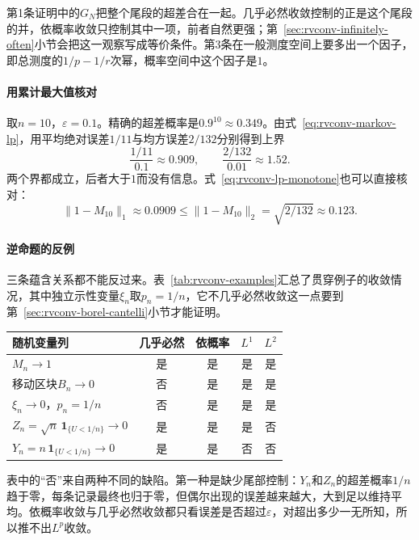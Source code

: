 第1条证明中的$G_N$把整个尾段的超差合在一起。几乎必然收敛控制的正是这个尾段的并，依概率收敛只控制其中一项，前者自然更强；第~\ref{sec:rvconv-infinitely-often}小节会把这一观察写成等价条件。第3条在一般测度空间上要多出一个因子，即总测度的$1/p-1/r$次幂，概率空间中这个因子是$1$。

\paragraph{用累计最大值核对}
取$n=10$，$\varepsilon=0.1$。精确的超差概率是$0.9^{10}\approx0.349$。由式~\eqref{eq:rvconv-markov-lp}，用平均绝对误差$1/11$与均方误差$2/132$分别得到上界
\[
 \frac{1/11}{0.1}\approx0.909,\qquad \frac{2/132}{0.01}\approx1.52 .
\]
两个界都成立，后者大于$1$而没有信息。式~\eqref{eq:rvconv-lp-monotone}也可以直接核对：
\[
 \lVert1-M_{10}\rVert_{1}\approx0.0909\leq\lVert1-M_{10}\rVert_{2}=\sqrt{2/132}\approx0.123 .
\]

\paragraph{逆命题的反例}
三条蕴含关系都不能反过来。表~\ref{tab:rvconv-examples}汇总了贯穿例子的收敛情况，其中独立示性变量$\xi_n$取$p_n=1/n$，它不几乎必然收敛这一点要到第~\ref{sec:rvconv-borel-cantelli}小节才能证明。

\begin{BookInlineTable}
 \centering
 \begin{tabular}{@{}lcccc@{}}
  \toprule
  随机变量列 & 几乎必然 & 依概率 & $L^{1}$ & $L^{2}$ \\
  \midrule
  $M_n\to1$ & 是 & 是 & 是 & 是 \\
  移动区块$B_n\to0$ & 否 & 是 & 是 & 是 \\
  $\xi_n\to0$，$p_n=1/n$ & 否 & 是 & 是 & 是 \\
  $Z_n=\sqrt n\,\mathbf{1}_{\{U<1/n\}}\to0$ & 是 & 是 & 是 & 否 \\
  $Y_n=n\,\mathbf{1}_{\{U<1/n\}}\to0$ & 是 & 是 & 否 & 否 \\
  \bottomrule
 \end{tabular}
 \caption{贯穿例子在四种意义下是否收敛。}
 \label{tab:rvconv-examples}
\end{BookInlineTable}

表中的“否”来自两种不同的缺陷。第一种是缺少尾部控制：$Y_n$和$Z_n$的超差概率$1/n$趋于零，每条记录最终也归于零，但偶尔出现的误差越来越大，大到足以维持平均。依概率收敛与几乎必然收敛都只看误差是否超过$\varepsilon$，对超出多少一无所知，所以推不出$L^{p}$收敛。


